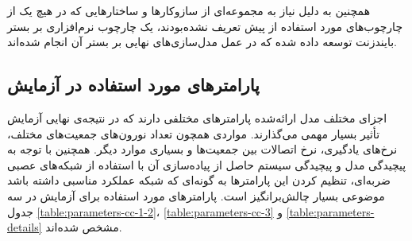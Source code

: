 \documentclass[12pt]{report}
\begin{document}
	همچنین به دلیل نیاز به مجموعه‌ای از سازوکار‌ها و ساختارهایی که در هیچ یک از چارچوب‌های مورد‌ استفاده از پیش تعریف نشده‌بودند، یک چارچوب نرم‌افزاری بر بستر بایندزنت توسعه داده شده‌ که در عمل مدل‌سازی‌های نهایی بر بستر آن انجام شده‌اند.
	
	\subsection{پارامتر‌های مورد استفاده در آزمایش}
	اجزای مختلف مدل ارائه‌شده پارامتر‌های مختلفی دارند که در نتیجه‌ی نهایی آزمایش تأثیر بسیار مهمی می‌گذارند. مواردی همچون تعداد نورون‌های جمعیت‌های مختلف، نرخ‌های یادگیری، نرخ اتصالات بین جمعیت‌ها و بسیاری موارد دیگر. همچنین با توجه به پیچیدگی مدل و پیچیدگی سیستم حاصل از پیاده‌سازی آن با استفاده از شبکه‌های عصبی ضربه‌ای، تنظیم کردن این پارامتر‌ها به گونه‌ای که شبکه عملکرد مناسبی داشته باشد موضوعی بسیار چالش‌برانگیز است. پارامتر‌های مورد استفاده برای آزمایش در سه جدول \ref{table:parameters-cc-1-2}، \ref{table:parameters-cc-3} و \ref{table:parameters-details} مشخص شده‌اند.
\end{document}
